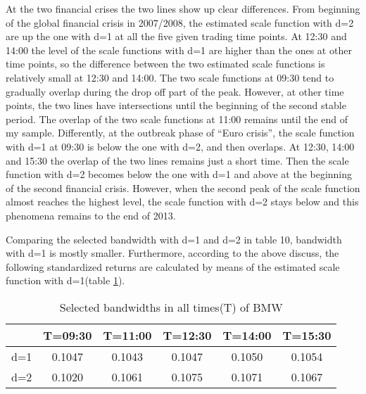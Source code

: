 At the two financial crises the two lines show up clear differences. From beginning of the global financial crisis in 2007/2008, the estimated scale function with d=2 are up the one with d=1 at all the five given trading time points. At 12:30 and 14:00 the level of the scale functions with d=1 are higher than the ones at other time points, so the difference between the two estimated scale functions is relatively small at 12:30 and 14:00. The two scale functions at 09:30 tend to gradually overlap during the drop off part of the peak. However, at other time points, the two lines have intersections until the beginning of the second stable period. The overlap of the two scale functions at 11:00 remains until the end of my sample. Differently, at the outbreak phase of  ``Euro crisis'', the scale function with d=1 at 09:30 is below the one with d=2, and then overlaps. At 12:30, 14:00 and 15:30 the overlap of the two lines remains just a short time. Then the scale function with d=2 becomes below the one with d=1 and above at the beginning of the second financial crisis. However, when the second peak of the scale function almost reaches the highest level, the scale function with d=2 stays below and this phenomena remains to the end of 2013.

Comparing the selected bandwidth with d=1 and d=2 in table 10, bandwidth with d=1 is mostly smaller. Furthermore, according to the above discuss, the following standardized returns are calculated by means of the estimated scale function with d=1(table \ref{tab:bandwidthBMW}).

\begin{table}[!h]
 \small
  \centering
  \vspace{2ex} 
\begin{tabular}{c|c|c|c|c|c}
\toprule
    &T=09:30&T=11:00&T=12:30&T=14:00&T=15:30 \\
\midrule
\hline
d=1	& 0.1047	& 0.1043	& 0.1047	& 0.1050	& 0.1054	\\
d=2	& 0.1020	& 0.1061	& 0.1075	& 0.1071	& 0.1067	\\
\bottomrule

\end{tabular}
  \caption{Selected bandwidths in all times(T) of BMW}
  \label{tab:bandwidthBMW}
\end{table}

